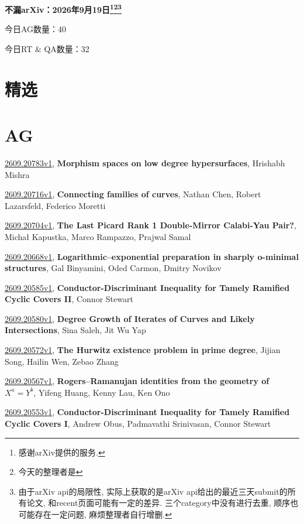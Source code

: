\documentclass[9pt, a4paper]{article}
\theoremstyle{plain}
\theoremstyle{definition}
\theoremstyle{remark}
\newcommand{\arxiv}[3]{\href{https://arxiv.org/abs/#1}{#1}, \textbf{\textcolor{arxivblue}{#2}}, #3}
\newcommand{\AGnumber}{40}
\newcommand{\RTQAnumber}{32}
\newcommand{\NewestDate}{2026年9月19日}
\newcommand{\todayarXiver}{} %
\begin{document}
\begin{center}
    \Huge\textbf{不漏arXiv：\NewestDate\footnote{感谢arXiv提供的服务.}\footnote{今天的整理者是\todayarXiver}\footnote{由于arXiv api的局限性, 实际上获取的是arXiv api给出的最近三天submit的所有论文, 和recent页面可能有一定的差异. 三个category中没有进行去重, 顺序也可能存在一定问题, 麻烦整理者自行增删.}} \\
\end{center}

\setcounter{section}{-1}

\begin{center}
    今日AG数量：\AGnumber
    
    今日RT \& QA数量：\RTQAnumber
    
\end{center}


\section{精选}


\section{AG}
\arxiv{2609.20783v1}{Morphism spaces on low degree hypersurfaces}{Hrishabh Mishra}

\arxiv{2609.20716v1}{Connecting families of curves}{Nathan Chen, Robert Lazarsfeld, Federico Moretti}

\arxiv{2609.20704v1}{The Last Picard Rank 1 Double-Mirror Calabi-Yau Pair?}{Michał Kapustka, Marco Rampazzo, Prajwal Samal}

\arxiv{2609.20668v1}{Logarithmic--exponential preparation in sharply o-minimal structures}{Gal Binyamini, Oded Carmon, Dmitry Novikov}

\arxiv{2609.20585v1}{Conductor-Discriminant Inequality for Tamely Ramified Cyclic Covers II}{Connor Stewart}

\arxiv{2609.20580v1}{Degree Growth of Iterates of Curves and Likely Intersections}{Sina Saleh, Jit Wu Yap}

\arxiv{2609.20572v1}{The Hurwitz existence problem in prime degree}{Jijian Song, Hailin Wen, Zebao Zhang}

\arxiv{2609.20567v1}{Rogers--Ramanujan identities from the geometry of $X^a=Y^b$}{Yifeng Huang, Kenny Lau, Ken Ono}

\arxiv{2609.20553v1}{Conductor-Discriminant Inequality for Tamely Ramified Cyclic Covers I}{Andrew Obus, Padmavathi Srinivasan, Connor Stewart}
\end{document}
